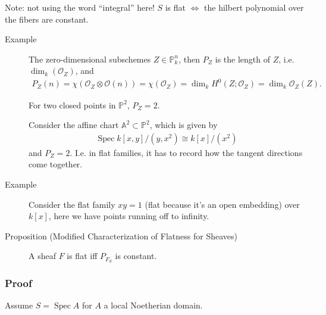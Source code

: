 
Note: not using the word ``integral'' here! \(S\) is flat \(\iff\) the
hilbert polynomial over the fibers are constant.

\begin{description}
\item[Example]
The zero-dimensional subschemes \(Z \in {\mathbb{P}}^n_k\), then \(P_Z\)
is the length of \(Z\), i.e.~\(\dim_k({\mathcal{O}}_Z)\), and
\begin{align*}
P_Z(n) = \chi({\mathcal{O}}_Z \otimes{\mathcal{O}}(n)) = \chi({\mathcal{O}}_Z) = \dim_k H^0(Z; {\mathcal{O}}_Z) = \dim_k {\mathcal{O}}_Z(Z)
.\end{align*}

For two closed points in \({\mathbb{P}}^2\), \(P_Z = 2\).

Consider the affine chart \({\mathbb{A}}^2 \subset {\mathbb{P}}^2\),
which is given by
\begin{align*}
\operatorname{Spec}k[x, y]/(y, x^2) \cong k[x]/(x^2)
\end{align*}
and \(P_Z = 2\). I.e. in flat families, it has to record how the tangent
directions come together.
\item[Example]
Consider the flat family \(xy = 1\) (flat because it's an open
embedding) over \(k[x]\), here we have points running off to infinity.
\item[Proposition (Modified Characterization of Flatness for Sheaves)]
A sheaf \(F\) is flat iff \(P_{F_S}\) is constant.
\end{description}

\hypertarget{proof}{%
\subsubsection{Proof}\label{proof}}

Assume \(S = \operatorname{Spec}A\) for \(A\) a local Noetherian domain.

